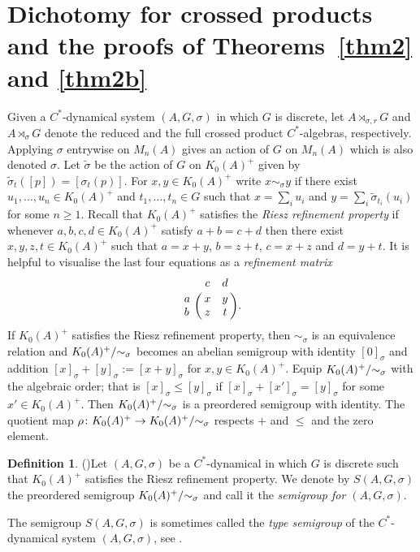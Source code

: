 \documentclass[a4paper, 12pt]{amsart}
\numberwithin{equation}{section}
\newcounter{theorem}
\theoremstyle{remark}
\theoremstyle{definition}
\newtheorem{defn}[theorem]{Definition}
\begin{document}
\section{Dichotomy for crossed products and the proofs of Theorems~\ref{thm2} and \ref{thm2b}}
\label{section.two} Given a $C^*$-dynamical system $(A,G,\sigma)$ in which $G$ is
discrete, let $A\rtimes_{\sigma,r} G$ and $A\rtimes_{\sigma} G$ denote the reduced and
the full crossed product $C^*$-algebras, respectively. Applying $\sigma$ entrywise on
$M_n(A)$ gives an action of $G$ on $M_n(A)$ which is also denoted $\sigma$. Let
$\tilde\sigma$ be the action of $G$ on $K_0(A)^+$ given by
$\tilde\sigma_t([p])=[\sigma_t(p)]$. For $x,y\in K_0(A)^+$ write $x\sim_\sigma y$ if
there exist $u_1,\dots,u_n\in K_0(A)^+$ and $t_1,\dots,t_n\in G$ such that $x=\sum_iu_i$
and $y=\sum_i\tilde\sigma_{t_i}(u_i)$ for some $n\geq 1$. Recall that $K_0(A)^+$
satisfies the \emph{Riesz refinement property} if  whenever $a,b,c,d\in K_0(A)^+$ satisfy
$a+b=c+d$  then there exist $x,y,z,t\in K_0(A)^+$ such that $a=x+y$,  $b=z+t$,  $c=x+z$
and $d=y+t$. It is helpful to visualise the last four equations as a \emph{refinement
matrix}
$$\label{ref.matrix}\bordermatrix{
 &c&d\cr  a&x&y\cr  b&z&t\cr}.$$
If $K_0(A)^+$ satisfies the Riesz refinement property, then $\sim_\sigma$ is
an equivalence relation and $K_0(A)^+/{\negthickspace}\sim_{\sigma}$ becomes an abelian semigroup
with identity $[0]_\sigma$ and addition $[x]_\sigma+[y]_\sigma:=[x+y]_\sigma$ for $x,y\in K_0(A)^+$.
Equip $K_0(A)^+/{\negthickspace}\sim_{\sigma}$ with the algebraic order; that is
$[x]_\sigma \leq [y]_\sigma$ if $[x]_\sigma+[x']_\sigma=[y]_\sigma$ for some $x'\in
K_0(A)^+$. Then $K_0(A)^+/{\negthickspace}\sim_{\sigma}$ is a preordered semigroup with identity. The quotient
map $\rho\colon K_0(A)^+\to K_0(A)^+/{\negthickspace}\sim_{\sigma}$ respects $+$ and $\leq$
and the zero element.

\begin{defn}({\cite[Definition 4.8]{Rai}})\label{def.S.A.G}
Let $(A,G,\sigma)$ be a $C^*$-dynamical in which $G$ is discrete such that $K_0(A)^+$
satisfies the Riesz refinement property. We denote by $S(A,G,\sigma)$ the preordered
semigroup $K_0(A)^+/{\negthickspace}\sim_{\sigma}$ and call it the \emph{semigroup for
$(A,G,\sigma)$}.
\end{defn}

The semigroup $S(A, G, \sigma)$ is sometimes called the \emph{type semigroup} of the $C^*$-dynamical system $(A,G,\sigma)$, see \cite{Rai}.
\end{document}
